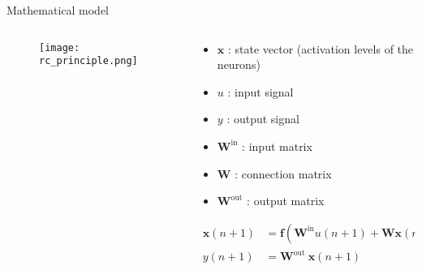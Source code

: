 \begin{frame}{Mathematical model}

	\begin{columns}
		\begin{column}{.5\textwidth}
			\begin{figure}
				\centering
				\texttt{[image: rc\_principle.png]}
				\caption{\cite{financialTimeSeries}}
			\end{figure}
		\end{column}%
		\begin{column}{.5\textwidth}
			\begin{itemize}
				\item $\mathbf{x}$ : state vector (activation levels of the neurons)
				\item $u$ : input signal
				\item $y$ : output signal
				\item $\mathbf{W}^{\text{in}}$ : input matrix
				\item $\mathbf{W}$ : connection matrix
				\item $\mathbf{W}^{\text{out}}$ : output matrix
			\end{itemize}
			\begin{alertblock}{}
				\begin{align}
				\mathbf{x}(n+1) &= \mathbf{f} \left( \mathbf{W}^{\text{in}} u(n+1) + \mathbf{W} \mathbf{x}(n) \right) \nonumber \\
				y(n+1) &= \mathbf{W}^{\text{out}} ~\mathbf{x}(n+1) \nonumber
			\end{align}
			\end{alertblock}
		\end{column}
	\end{columns}

\end{frame}

